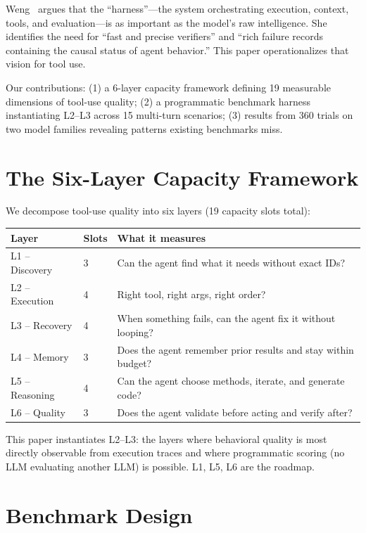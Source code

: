 \documentclass[11pt]{article}
\begin{document}
Weng~\cite{weng2026harness} argues that the ``harness''---the system
orchestrating execution, context, tools, and evaluation---is as important as
the model's raw intelligence. She identifies the need for ``fast and precise
verifiers'' and ``rich failure records containing the causal status of agent
behavior.'' This paper operationalizes that vision for tool use.

Our contributions: (1) a 6-layer capacity framework defining 19 measurable
dimensions of tool-use quality; (2) a programmatic benchmark harness
instantiating L2--L3 across 15 multi-turn scenarios; (3) results from 360
trials on two model families revealing patterns existing benchmarks miss.

\section{The Six-Layer Capacity Framework}

We decompose tool-use quality into six layers (19 capacity slots total):

\begin{center}
\begin{tabular}{llp{6cm}}
\toprule
\textbf{Layer} & \textbf{Slots} & \textbf{What it measures} \\
\midrule
L1 -- Discovery      & 3 & Can the agent find what it needs without exact IDs? \\
L2 -- Execution      & 4 & Right tool, right args, right order? \\
L3 -- Recovery       & 4 & When something fails, can the agent fix it without looping? \\
L4 -- Memory         & 3 & Does the agent remember prior results and stay within budget? \\
L5 -- Reasoning      & 4 & Can the agent choose methods, iterate, and generate code? \\
L6 -- Quality        & 3 & Does the agent validate before acting and verify after? \\
\bottomrule
\end{tabular}
\end{center}

This paper instantiates L2--L3: the layers where behavioral quality is most
directly observable from execution traces and where programmatic scoring (no
LLM evaluating another LLM) is possible. L1, L5, L6 are the roadmap.

\section{Benchmark Design}
\end{document}

